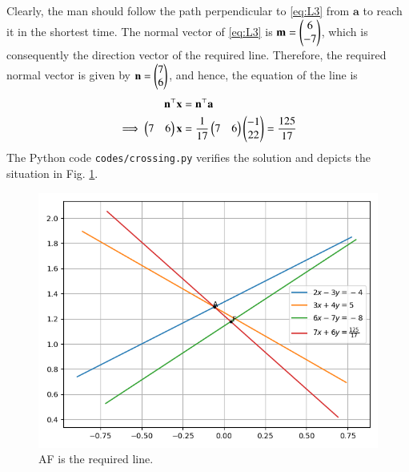 \documentclass[journal,12pt,twocolumn]{IEEEtran}
\let\vec\mathbf
\begin{document}
\begin{enumerate}
    Clearly, the man should follow the path perpendicular to \eqref{eq:L3} from
    $\vec{a}$ to reach it in the shortest time. The normal vector 
    of \eqref{eq:L3} is $\vec{m} = \myvec{6\\-7}$, which is consequently the 
    direction vector of the required line. Therefore, the required normal vector
    is given by $\vec{n} = \myvec{7\\6}$, and hence, the equation of the line is
    \begin{align}
        \vec{n}^\top\vec{x} &= \vec{n}^\top\vec{a} \\
        \implies \myvec{7&6}\vec{x} &= \frac{1}{17}\myvec{7&6}\myvec{-1\\22} = \frac{125}{17}
        \label{eq:L4}
    \end{align}
    The Python code \texttt{codes/crossing.py} verifies the solution and depicts
    the situation in Fig. \ref{fig:crossing}.
    \begin{figure}[!ht]
        \centering
        \includegraphics[width=\columnwidth]{figs/crossing.png}
        \caption{AF is the required line.}
        \label{fig:crossing}
    \end{figure}
\end{enumerate}
\end{document}
